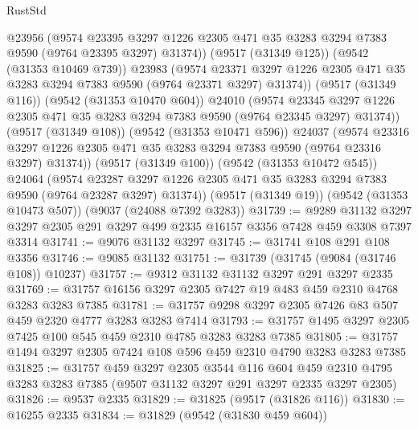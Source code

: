 \begin{lexlean}{RustStd}
\begin{coremodule}
              @23956
              (@9574
                @23395
                @3297
                @1226
                @2305
                @471
                @35
                @3283
                @3294
                @7383
                @9590
                (@9764 @23395 @3297)
                @31374))
            (@9517 (@31349 @125))
            (@9542 (@31353 @10469 @739))
            @23983
            (@9574
              @23371
              @3297
              @1226
              @2305
              @471
              @35
              @3283
              @3294
              @7383
              @9590
              (@9764 @23371 @3297)
              @31374))
          (@9517 (@31349 @116))
          (@9542 (@31353 @10470 @604))
          @24010
          (@9574
            @23345
            @3297
            @1226
            @2305
            @471
            @35
            @3283
            @3294
            @7383
            @9590
            (@9764 @23345 @3297)
            @31374))
        (@9517 (@31349 @108))
        (@9542 (@31353 @10471 @596))
        @24037
        (@9574
          @23316
          @3297
          @1226
          @2305
          @471
          @35
          @3283
          @3294
          @7383
          @9590
          (@9764 @23316 @3297)
          @31374))
      (@9517 (@31349 @100))
      (@9542 (@31353 @10472 @545))
      @24064
      (@9574 @23287 @3297 @1226 @2305 @471 @35 @3283 @3294 @7383 @9590 (@9764 @23287 @3297) @31374))
    (@9517 (@31349 @19))
    (@9542 (@31353 @10473 @507))
    (@9037 (@24088 @7392 @3283))
@31739 := @9289
    @31132
    @3297
    @3297
    @2305
    @291
    @3297
    @499
    @2335
    @16157
    @3356
    @7428
    @459
    @3308
    @7397
    @3314
@31741 := @9076 @31132 @3297
@31745 := @31741 @108 @291 @108 @3356
@31746 := @9085 @31132
@31751 := @31739 (@31745 (@9084 (@31746 @108)) @10237)
@31757 := @9312 @31132 @31132 @3297 @291 @3297 @2335
@31769 := @31757 @16156 @3297 @2305 @7427 @19 @483 @459 @2310 @4768 @3283 @3283 @7385
@31781 := @31757 @9298 @3297 @2305 @7426 @83 @507 @459 @2320 @4777 @3283 @3283 @7414
@31793 := @31757 @1495 @3297 @2305 @7425 @100 @545 @459 @2310 @4785 @3283 @3283 @7385
@31805 := @31757 @1494 @3297 @2305 @7424 @108 @596 @459 @2310 @4790 @3283 @3283 @7385
@31825 := @31757
    @459
    @3297
    @2305
    @3544
    @116
    @604
    @459
    @2310
    @4795
    @3283
    @3283
    @7385
    (@9507 @31132 @3297 @291 @3297 @2335 @3297 @2305)
@31826 := @9537 @2335
@31829 := @31825 (@9517 (@31826 @116))
@31830 := @16255 @2335
@31834 := @31829 (@9542 (@31830 @459 @604))

\end{coremodule}
\end{lexlean}
